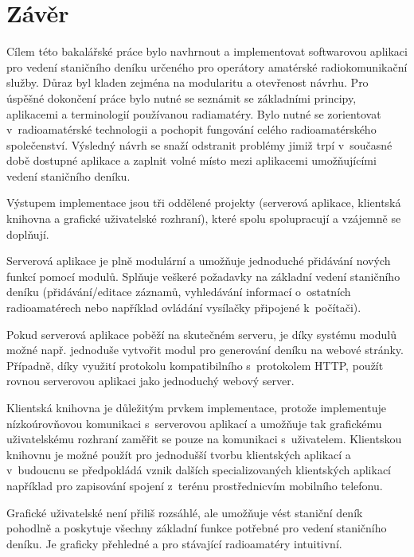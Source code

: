 \chapter{Závěr}
Cílem této bakalářské práce bylo navhrnout a implementovat softwarovou aplikaci
pro vedení staničního deníku určeného pro operátory amatérské radiokomunikační služby. Důraz byl kladen zejména
na modularitu a otevřenost návrhu. Pro úspěšné dokončení práce bylo nutné se
seznámit se 
základními principy, aplikacemi a terminologií používanou radiamatéry.
Bylo nutné se zorientovat
v~radioamatérské technologii a pochopit fungování celého radioamatérského společenství.
Výsledný návrh se snaží odstranit problémy jimiž trpí v~současné době dostupné
aplikace a zaplnit volné místo mezi aplikacemi umožňujícími vedení staničního deníku.

Výstupem implementace jsou tři oddělené projekty (serverová aplikace, klientská knihovna a grafické uživatelské rozhraní),
které spolu spolupracují a vzájemně se doplňují.

Serverová aplikace je plně modulární a umožňuje jednoduché přidávání nových
funkcí pomocí modulů. Splňuje veškeré požadavky na základní vedení staničního deníku (přidávání/editace záznamů, vyhledávání 
informací o~ostatních radioamatérech nebo například ovládání vysílačky připojené k~počítači).

Pokud serverová aplikace poběží na skutečném serveru, je díky systému modulů
možné např. jednoduše vytvořit modul
pro generování deníku na webové stránky. Případně, díky využití protokolu kompatibilního s~protokolem HTTP, použít rovnou
serverovou aplikaci jako jednoduchý webový server.

Klientská knihovna je důležitým prvkem implementace, protože implementuje nízkoúrovňovou komunikaci s~serverovou aplikací
a umožňuje tak grafickému uživatelskému rozhraní zaměřit se pouze na komunikaci s~uživatelem. Klientskou knihovnu
je možné použít pro jednodušší tvorbu klientských aplikací a v~budoucnu se předpokládá vznik dalších specializovaných
klientských aplikací například pro zapisování spojení z~terénu prostřednicvím mobilního telefonu.

Grafické uživatelské není přiliš rozsáhlé, ale umožňuje vést staniční deník pohodlně a poskytuje všechny základní funkce potřebné
pro vedení staničního deníku. Je graficky přehledné a pro stávající radioamatéry intuitivní.

